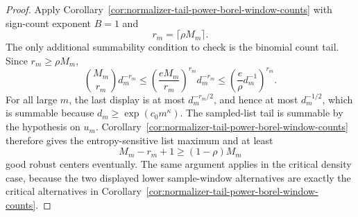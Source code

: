 \documentclass[11pt]{amsart}
\numberwithin{equation}{section}
\theoremstyle{definition}
\theoremstyle{remark}
\begin{document}
\begin{proof}
Apply Corollary~\ref{cor:normalizer-tail-power-borel-window-counts} with
sign-count exponent \(B=1\) and
\[
  r_m=\lceil\rho M_m\rceil .
\]
The only additional summability condition to check is the binomial count tail.
Since \(r_m\ge\rho M_m\),
\[
  \binom{M_m}{r_m}d_m^{-r_m}
  \le \left(\frac{eM_m}{r_m}\right)^{r_m}d_m^{-r_m}
  \le \left(\frac{e}{\rho}d_m^{-1}\right)^{r_m}.
\]
For all large \(m\), the last display is at most \(d_m^{-r_m/2}\), and hence at
most \(d_m^{-1/2}\), which is summable because
\(d_m\ge\exp(c_0m^\kappa)\).  The sampled-list tail is summable by the
hypothesis on \(u_m\).  Corollary~\ref{cor:normalizer-tail-power-borel-window-counts}
therefore gives the entropy-sensitive list maximum and at least
\[
  M_m-r_m+1\ge (1-\rho)M_m
\]
good robust centers eventually.  The same argument applies in the critical
density case, because the two displayed lower sample-window alternatives are
exactly the critical alternatives in
Corollary~\ref{cor:normalizer-tail-power-borel-window-counts}.
\end{proof}
\end{document}
